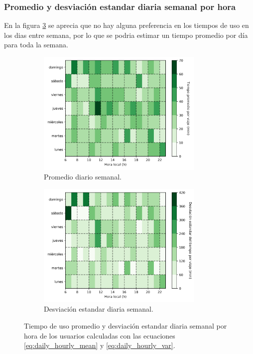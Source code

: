 \subsubsection{Promedio y desviación estandar diaria semanal por hora}

En la figura \ref{fig:daily_hourly_time} se aprecia que no hay alguna preferencia en los tiempos de uso en los dias entre semana, por lo que se podria estimar un tiempo promedio por día para toda la semana.

\begin{figure}[H]
    \centering
    \begin{subfigure}[b]{8cm}
        \includegraphics[width=8cm]{Graphics/daily_hourly_mean_time_travel.png}
        \caption{Promedio diario semanal.}
        \label{fig:daily_hourly_mean_time}
    \end{subfigure}
    \begin{subfigure}[b]{8cm}
        \includegraphics[width=8cm]{Graphics/daily_hourly_var_time_travel.png}
        \caption{Desviación estandar diaria semanal.}
        \label{fig:daily_hourly_var_time}
    \end{subfigure}
    \caption{Tiempo de uso promedio y desviación estandar diaria semanal por hora de los usuarios calculadas con las ecuaciones \ref{eq:daily_hourly_mean} y \ref{eq:daily_hourly_var}.}
    \label{fig:daily_hourly_time}
\end{figure}

